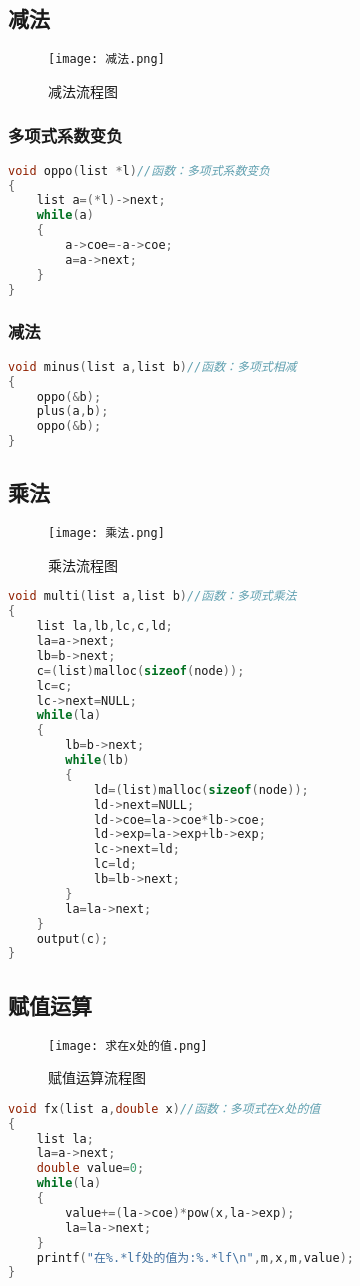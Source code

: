 \documentclass{DateStructure}
\begin{document}
\subsection{减法}
\begin{figure}[H]
\centering
\texttt{[image: 减法.png]}
\caption{减法流程图}
\end{figure}
\subsubsection{多项式系数变负}
\begin{lstlisting}[language=C,caption={oppo}]
void oppo(list *l)//函数：多项式系数变负
{
	list a=(*l)->next;
	while(a)
	{
		a->coe=-a->coe;
		a=a->next;
	}
}
\end{lstlisting}
\subsubsection{减法}
\begin{lstlisting}[language=C,caption={minus}]
void minus(list a,list b)//函数：多项式相减
{
	oppo(&b);
	plus(a,b);
	oppo(&b);
}
\end{lstlisting}
\subsection{乘法}
\begin{figure}[H]
\centering
\texttt{[image: 乘法.png]}
\caption{乘法流程图}
\end{figure}
\begin{lstlisting}[language=C,caption={multi}]
void multi(list a,list b)//函数：多项式乘法
{
	list la,lb,lc,c,ld;
	la=a->next;
	lb=b->next;
	c=(list)malloc(sizeof(node));
	lc=c;
	lc->next=NULL;
	while(la)
	{
		lb=b->next;
		while(lb)
		{
			ld=(list)malloc(sizeof(node));
			ld->next=NULL;
			ld->coe=la->coe*lb->coe;
			ld->exp=la->exp+lb->exp;
			lc->next=ld;
			lc=ld;
			lb=lb->next;
		}
		la=la->next;
	}
	output(c);
}
\end{lstlisting}
\subsection{赋值运算}
\begin{figure}[H]
\centering
\texttt{[image: 求在x处的值.png]}
\caption{赋值运算流程图}
\end{figure}
\begin{lstlisting}[language=C,caption={fx}]
void fx(list a,double x)//函数：多项式在x处的值
{
	list la;
	la=a->next;
	double value=0;
	while(la)
	{
		value+=(la->coe)*pow(x,la->exp);
		la=la->next;
	}
	printf("在%.*lf处的值为:%.*lf\n",m,x,m,value);
}
\end{lstlisting}	
\end{document}
